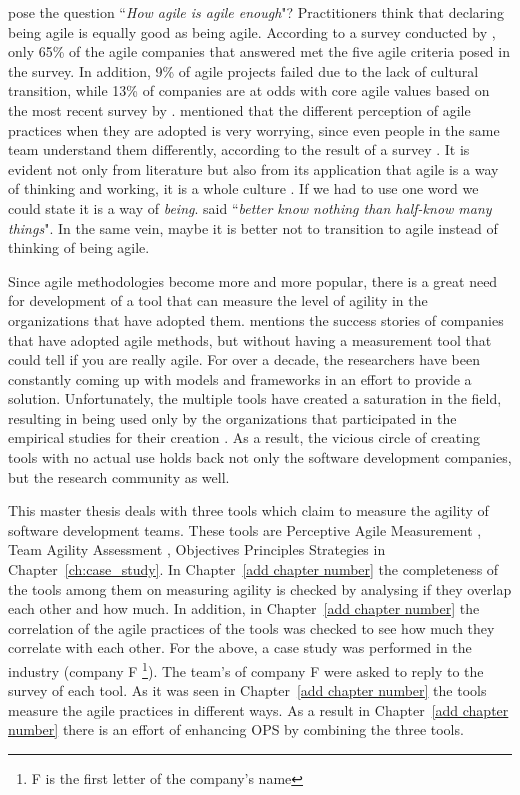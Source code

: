 \citet{comparative_agility} pose the question ``\textit{How agile is agile enough}"? Practitioners think that declaring being agile is equally good as being agile. According to a survey conducted by \citet{ambysoft}, only 65\% of the agile companies that answered met the five agile criteria posed in the survey. In addition, 9\% of agile projects failed due to the lack of cultural transition, while 13\% of companies are at odds with core agile values based on the most recent survey by \citet{versionOne}. \citet{poonacha} mentioned that the different perception of agile practices when they are adopted is very worrying, since even people in the same team understand them differently, according to the result of a survey \cite{ambler}. It is evident not only from literature but also from its application that agile is a way of thinking and working, it is a whole culture \cite{poonacha}. If we had to use one word we could state it is a way of \textit{being}. \citet{Nietzsche} said ``\textit{better know nothing than half-know many things}". In the same vein, maybe it is better not to transition to agile instead of thinking of being agile. 

Since agile methodologies become more and more popular, there is a great need for development of a tool that can measure the level of agility in the organizations that have adopted them. \citet{sidky} mentions the success stories of companies that have adopted agile methods, but without having a measurement tool that could tell if you are really agile. For over a decade, the researchers have been constantly coming up with models and frameworks in an effort to provide a solution. Unfortunately, the multiple tools have created a saturation in the field, resulting in being used only by the organizations that participated in the empirical studies for their creation \cite{samireh_jalali_dissertation}\cite{Jalali2014}. As a result, the vicious circle of creating tools with no actual use holds back not only the software development companies, but the research community as well.

This master thesis deals with three tools which claim to measure the agility of software development teams. These tools are Perceptive Agile Measurement \cite{pam}, Team Agility Assessment \cite{Leffingwell}, Objectives Principles Strategies \cite{sventha_dissertation} in Chapter~\ref{ch:case_study}. In Chapter~\ref{add chapter number} the completeness of the tools among them on measuring agility is checked by analysing if they overlap each other and how much. In addition, in Chapter~\ref{add chapter number} the correlation of the agile practices of the tools was checked to see how much they correlate with each other. For the above, a case study was performed in the industry (company F \footnote{F is the first letter of the company's name}). The team's of company F were asked to reply to the survey of each tool. As it was seen in Chapter~\ref{add chapter number} the tools measure the agile practices in different ways. As a result in Chapter~\ref{add chapter number} there is an effort of enhancing OPS by combining the three tools.

